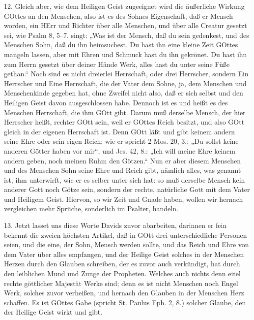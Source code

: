 12. Gleich aber, wie dem Heiligen Geist zugeeignet wird die äußerliche Wirkung GOttes an den Menschen, also ist es des Sohnes Eigenschaft, daß er Mensch worden, ein HErr und Richter über alle Menschen, und über alle Creatur gesetzt sei, wie Psalm 8, 5–7. singt: „Was ist der Mensch, daß du sein gedenkest, und des Menschen Sohn, daß du ihn heimsuchest. Du hast ihn eine kleine Zeit GOttes mangeln lassen, aber mit Ehren und Schmuck hast du ihn gekrönet. Du hast ihn zum Herrn gesetzt über deiner Hände Werk, alles hast du unter seine Füße gethan.“ Noch sind es nicht dreierlei Herrschaft, oder drei Herrscher, sondern Ein Herrscher und Eine Herrschaft, die der Vater dem Sohne, ja, dem Menschen und Menschenkinde gegeben hat, ohne Zweifel nicht also, daß er sich selbst und den Heiligen Geist davon ausgeschlossen
habe. Dennoch ist es und heißt es des Menschen Herrschaft, die ihm GOtt gibt. Darum muß derselbe Mensch, der hier Herrscher heißt, rechter GOtt sein, weil er GOttes Reich besitzt, und also GOtt gleich in der eigenen Herrschaft ist. Denn GOtt läßt und gibt keinem andern seine Ehre oder sein eigen Reich; wie er spricht 2 Mos. 20, 3.: „Du sollst keine anderen Götter haben vor mir“, und Jes. 42, 8.: „Ich will meine Ehre keinem andern geben, noch meinen Ruhm den Götzen.“ Nun er aber diesem Menschen und des Menschen Sohn seine Ehre und Reich gibt, nämlich alles, was genannt ist, ihm unterwirft, wie er es selber unter sich hat: so muß derselbe Mensch kein anderer Gott noch Götze sein, sondern der rechte, natürliche Gott mit dem Vater und Heiligem Geist. Hiervon, so wir Zeit und Gnade haben, wollen wir hernach vergleichen mehr Sprüche, sonderlich im Psalter, handeln.

13. Jetzt lasset uns diese Worte Davids zuvor abarbeiten, darinnen er fein bekennt die zweien höchsten Artikel, daß in GOtt drei unterschiedliche Personen seien, und die eine, der Sohn, Mensch werden sollte, und das Reich und Ehre von dem Vater über alles empfangen, und der Heilige Geist solches in der Menschen Herzen durch den Glauben schreiben, der es zuvor auch verkündigt, hat durch den leiblichen Mund und Zunge der Propheten. Welches auch nichts denn eitel rechte göttlicher Majestät Werke sind; denn es ist nicht Menschen noch Engel Werk, solches zuvor verheißen, und hernach den Glauben in der Menschen Herz schaffen. Es ist GOttes Gabe (spricht St. Paulus Eph. 2, 8.) solcher Glaube, den der Heilige Geist wirkt und gibt.

